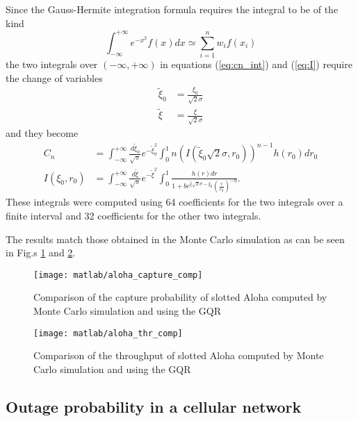 \documentclass[a4paper,oneside]{article}
\renewcommand{\approx}[0]{\simeq}
\begin{document}
Since the Gauss-Hermite integration formula requires the integral to
be of the kind
\begin{equation}
  \int_{-\infty}^{+\infty} e^{-x^2}f(x)dx \approx \sum_{i=1}^n w_i f(x_i)
\end{equation}
the two integrals over $(-\infty, +\infty)$ in equations
(\ref{eq:cn_int}) and (\ref{eq:I}) require the change of variables
\begin{align}
  \tilde{\xi}_0 &= \frac{\xi_0}{\sqrt{2}\sigma} \\
  \tilde{\xi} &= \frac{\xi}{\sqrt{2}\sigma} 
\end{align}
and they become
\begin{align}
  C_n &= \int_{-\infty}^{+\infty} \frac{d\tilde{\xi}_0}{\sqrt{\pi}} e^{-\tilde{\xi}_0^2}
  \int_0^1 n\left( I(\tilde{\xi}_0\sqrt{2}\sigma, r_0) \right)^{n-1} h(r_0)dr_0
  \label{eq:cn_int_sub} \\
  I(\xi_0, r_0) &= \int_{-\infty}^{+\infty} \frac{d\tilde{\xi}}{\sqrt{\pi}} e^{-\tilde{\xi}^2}
  \int_0^1 \frac{h(r)dr}{1 + be^{\tilde{\xi}\sqrt{2}\sigma - \xi_0}\left( \frac{r}{r_0} \right)^{-\eta}} .
  \label{eq:I_sub}
\end{align}
These integrals were computed using 64 coefficients for the two
integrals over a finite interval and 32 coefficients for the other two
integrals.

The results match those obtained in the Monte Carlo simulation as can
be seen in Fig.s \ref{plot:aloha_capture_comp} and
\ref{plot:aloha_thr_comp}.
\begin{figure}[htbp]
  \centering
  \texttt{[image: matlab/aloha\_capture\_comp]}
  \caption{Comparison of the capture probability of slotted Aloha
    computed by Monte Carlo simulation and using the GQR}
  \label{plot:aloha_capture_comp}
\end{figure}
\begin{figure}[htbp]
  \centering
  \texttt{[image: matlab/aloha\_thr\_comp]}
  \caption{Comparison of the throughput of slotted Aloha computed by
    Monte Carlo simulation and using the GQR}
  \label{plot:aloha_thr_comp}
\end{figure}

\subsection*{Outage probability in a cellular network}
\end{document}
